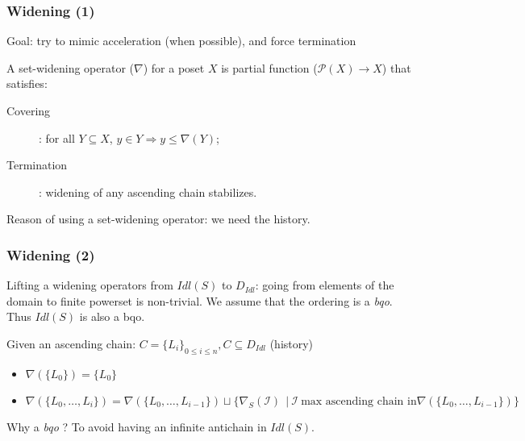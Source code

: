 \documentclass{beamer}
\begin{document}
\begin{frame}
  \frametitle{Widening (1)}

  Goal: try to mimic acceleration (when possible), and force termination
  
  \vspace{1ex}

  A set-widening operator ($\nabla$) for a poset $X$ is partial function ($\mathcal{P}(X) \rightarrow X$) that satisfies:
  \begin{description}
  \item[Covering]: for all $Y \subseteq X$, $y \in Y \Rightarrow y \leq \nabla(Y)$;
  \item[Termination]: widening of any ascending chain stabilizes.
  \end{description}

  \vspace{1ex}

  Reason of using a set-widening operator: we need the history.

\end{frame}

\begin{frame}
  \frametitle{Widening (2)}

  Lifting a widening operators from $\mathit{Idl}(S)$ to $D_{\mathit{Idl}}$:
  going from elements of the domain to finite powerset is non-trivial.
  We assume that the ordering is a \emph{bqo}.
  Thus $\mathit{Idl}(S)$ is also a bqo.

  \vspace{1ex}
  
  Given an ascending chain: $C = \{L_i\}_{0 \leq i \leq n}, C \subseteq D_{\mathit{Idl}}$ (history)
  \begin{itemize}
  \item $\nabla(\{L_0\}) = \{L_0\}$
  \item $\nabla(\{L_0, \ldots, L_i\}) = \nabla(\{L_0, \ldots, L_{i-1}\}) \sqcup \{\nabla_S(\mathcal{I})\ ~|~ \mathcal{I} ~ \text{max ascending chain in} \nabla(\{L_0, \ldots, L_{i-1}\})\}$
  \end{itemize}

  \vspace{1ex}

  Why a \emph{bqo} ? 
  To avoid having an infinite antichain in $\mathit{Idl}(S)$.


\end{frame}
\end{document}
